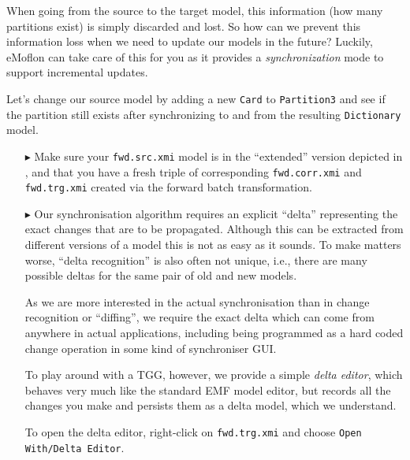 When going from the source to the target model, this information (how many partitions exist) is simply discarded and lost. 
So how can we prevent this information loss when we need to update our models in the future? Luckily, eMoflon can take care of this for you as it provides a \emph{synchronization} mode to support incremental updates.

Let's change our source model by adding a new \texttt{Card} to \texttt{Partition3} and see if the partition still exists after synchronizing to and from the resulting \texttt{Dictionary} model.

\begin{itemize}
\item[$\blacktriangleright$] Make sure your \texttt{fwd.src.xmi} model is in the ``extended'' version depicted in , and that you have a fresh triple of corresponding \texttt{fwd.corr.xmi} and \texttt{fwd.trg.xmi} created via the forward batch transformation.

\item[$\blacktriangleright$] Our synchronisation algorithm requires an explicit ``delta'' representing the exact changes that are to be propagated.
Although this can be extracted from different versions of a model this is not as easy as it sounds.
To make matters worse, ``delta recognition'' is also often not unique, i.e., there are many possible deltas for the same pair of old and new models.

As we are more interested in the actual synchronisation than in change recognition or ``diffing'', we require the exact delta which can come from anywhere in actual applications, including being programmed as a hard coded change operation in some kind of synchroniser GUI.

To play around with a TGG, however, we provide a simple \emph{delta editor}, which behaves very much like the standard EMF model editor, but records all the changes you make and persists them as a delta model, which we understand.

To open the delta editor, right-click on \texttt{fwd.trg.xmi} and choose \texttt{Open With/Delta Editor}.


\end{itemize}

